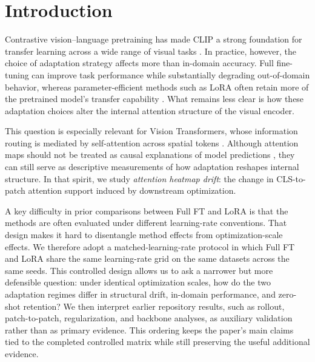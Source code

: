 \documentclass[10pt]{article}
\begin{document}
\section{Introduction}
Contrastive vision--language pretraining has made CLIP a strong foundation for transfer learning across a wide range of visual tasks \citep{radford2021learning}. In practice, however, the choice of adaptation strategy affects more than in-domain accuracy. Full fine-tuning can improve task performance while substantially degrading out-of-domain behavior, whereas parameter-efficient methods such as LoRA often retain more of the pretrained model's transfer capability \citep{kumar2022finetuning,wortsman2022robust,hu2022lora}. What remains less clear is how these adaptation choices alter the internal attention structure of the visual encoder.

This question is especially relevant for Vision Transformers, whose information routing is mediated by self-attention across spatial tokens \citep{dosovitskiy2021image}. Although attention maps should not be treated as causal explanations of model predictions \citep{jain2019attention,wiegreffe2019attention}, they can still serve as descriptive measurements of how adaptation reshapes internal structure. In that spirit, we study \emph{attention heatmap drift}: the change in CLS-to-patch attention support induced by downstream optimization.

A key difficulty in prior comparisons between Full FT and LoRA is that the methods are often evaluated under different learning-rate conventions. That design makes it hard to disentangle method effects from optimization-scale effects. We therefore adopt a matched-learning-rate protocol in which Full FT and LoRA share the same learning-rate grid on the same datasets across the same seeds. This controlled design allows us to ask a narrower but more defensible question: under identical optimization scales, how do the two adaptation regimes differ in structural drift, in-domain performance, and zero-shot retention? We then interpret earlier repository results, such as rollout, patch-to-patch, regularization, and backbone analyses, as auxiliary validation rather than as primary evidence. This ordering keeps the paper's main claims tied to the completed controlled matrix while still preserving the useful additional evidence.
\end{document}
